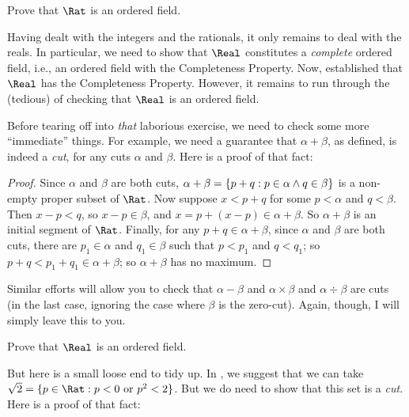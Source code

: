 \documentclass[../../../include/open-logic-section]{subfiles}
\begin{document}
\begin{prob}
Prove that $\Rat$ is an ordered field.
\end{prob}

Having dealt with the integers and the rationals, it only remains to
deal with the reals. In particular, we need to show that $\Real$
constitutes a \emph{complete} ordered field, i.e., an ordered field
with the Completeness Property. Now, 
established that $\Real$ has the Completeness Property. However, it
remains to run through the (tedious) of checking that $\Real$ is an
ordered field. 

Before tearing off into \emph{that} laborious exercise, we need to
check some more ``immediate'' things. For example, we need a guarantee
that $\alpha + \beta$, as defined, is indeed a \emph{cut}, for any
cuts $\alpha$ and $\beta$. Here is a proof of that fact:

\begin{proof}	
Since $\alpha$ and $\beta$ are both cuts, $\alpha + \beta = \{ p
+ q : p \in \alpha \land q \in \beta \}$ is a non-empty proper subset of
$\Rat$. Now suppose $x < p + q$ for some $p < \alpha$ and $q < \beta$.
Then $x - p < q$, so $x - p \in \beta$, and $x = p + (x - p) \in
\alpha + \beta$. So $\alpha + \beta$ is an initial segment of $\Rat$.
Finally, for any $p + q \in \alpha + \beta$, since $\alpha$ and
$\beta$ are both cuts, there are $p_1 \in \alpha$ and $q_1 \in \beta$
such that $p < p_1$ and $q < q_1$; so $p + q < p_1 + q_1 \in \alpha +
\beta$; so $\alpha + \beta$ has no maximum. 
\end{proof}

Similar efforts will allow you to check that $\alpha - \beta$ and
$\alpha \times \beta$ and $\alpha \div \beta$ are cuts (in the last
case, ignoring the case where $\beta$ is the zero-cut). Again, though,
I will simply leave this to you. 

\begin{prob}
Prove that $\Real$ is an ordered field.
\end{prob}

But here is a small loose end to tidy up. In
, we suggest that we can take $\sqrt{2} =
\Setabs{p \in \Rat}{p < 0 \text{ or }p^2 < 2}$. But we do need to show
that this set is a \emph{cut}. Here is a proof of that fact:
\end{document}
